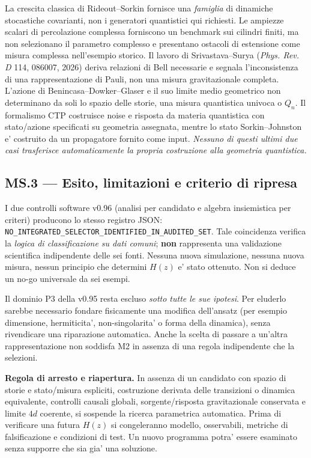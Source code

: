 \documentclass[11pt,a4paper]{article}
\begin{document}
La crescita classica di Rideout--Sorkin fornisce una \emph{famiglia} di dinamiche stocastiche covarianti, non i generatori quantistici qui richiesti. Le ampiezze scalari di percolazione complessa forniscono un benchmark sui cilindri finiti, ma non selezionano il parametro complesso e presentano ostacoli di estensione come misura complessa nell'esempio storico. Il lavoro di Srivastava--Surya (\emph{Phys. Rev. D} 114, 086007, 2026) deriva relazioni di Bell necessarie e segnala l'inconsistenza di una rappresentazione di Pauli, non una misura gravitazionale completa. L'azione di Benincasa--Dowker--Glaser e il suo limite medio geometrico non determinano da soli lo spazio delle storie, una misura quantistica univoca o $Q_n$. Il formalismo CTP costruisce noise e risposta da materia quantistica con stato/azione specificati su geometria assegnata, mentre lo stato Sorkin--Johnston e' costruito da un propagatore fornito come input. \emph{Nessuno di questi ultimi due casi trasferisce automaticamente la propria costruzione alla geometria quantistica.}

\clearpage
\subsection*{MS.3 --- Esito, limitazioni e criterio di ripresa}
I due controlli software v0.96 (analisi per candidato e algebra insiemistica per criteri) producono lo stesso registro JSON: \texttt{NO\_INTEGRATED\_SELECTOR\_IDENTIFIED\_IN\_AUDITED\_SET}. Tale coincidenza verifica la \emph{logica di classificazione su dati comuni}; \textbf{non} rappresenta una validazione scientifica indipendente delle sei fonti. Nessuna nuova simulazione, nessuna nuova misura, nessun principio che determini $H(z)$ e' stato ottenuto. Non si deduce un no-go universale da sei esempi.

Il dominio P3 della v0.95 resta escluso \emph{sotto tutte le sue ipotesi}. Per eluderlo sarebbe necessario fondare fisicamente una modifica dell'ansatz (per esempio dimensione, hermiticita', non-singolarita' o forma della dinamica), senza rivendicare una riparazione automatica. Anche la scelta di passare a un'altra rappresentazione non soddisfa M2 in assenza di una regola indipendente che la selezioni.

\textbf{Regola di arresto e riapertura.} In assenza di un candidato con spazio di storie e stato/misura espliciti, costruzione derivata delle transizioni o dinamica equivalente, controlli causali globali, sorgente/risposta gravitazionale conservata e limite $4d$ coerente, si sospende la ricerca parametrica automatica. Prima di verificare una futura $H(z)$ si congeleranno modello, osservabili, metriche di falsificazione e condizioni di test. Un nuovo programma potra' essere esaminato senza supporre che sia gia' una soluzione.
\end{document}

